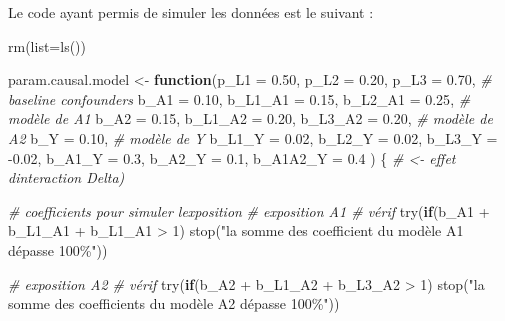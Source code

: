 \documentclass[
]{book}
\newenvironment{Shaded}{\begin{snugshade}}{\end{snugshade}}
\newcommand{\AttributeTok}[1]{\textcolor[rgb]{0.77,0.63,0.00}{#1}}
\newcommand{\CommentTok}[1]{\textcolor[rgb]{0.56,0.35,0.01}{\textit{#1}}}
\newcommand{\ControlFlowTok}[1]{\textcolor[rgb]{0.13,0.29,0.53}{\textbf{#1}}}
\newcommand{\DecValTok}[1]{\textcolor[rgb]{0.00,0.00,0.81}{#1}}
\newcommand{\FloatTok}[1]{\textcolor[rgb]{0.00,0.00,0.81}{#1}}
\newcommand{\FunctionTok}[1]{\textcolor[rgb]{0.00,0.00,0.00}{#1}}
\newcommand{\NormalTok}[1]{#1}
\newcommand{\OtherTok}[1]{\textcolor[rgb]{0.56,0.35,0.01}{#1}}
\newcommand{\SpecialCharTok}[1]{\textcolor[rgb]{0.00,0.00,0.00}{#1}}
\newcommand{\StringTok}[1]{\textcolor[rgb]{0.31,0.60,0.02}{#1}}
\begin{document}
Le code ayant permis de simuler les données est le suivant :

\begin{Shaded}
\begin{Highlighting}[]
  \FunctionTok{rm}\NormalTok{(}\AttributeTok{list=}\FunctionTok{ls}\NormalTok{())}

\NormalTok{  param.causal.model }\OtherTok{\textless{}{-}} \ControlFlowTok{function}\NormalTok{(}\AttributeTok{p\_L1 =} \FloatTok{0.50}\NormalTok{, }
                                 \AttributeTok{p\_L2 =} \FloatTok{0.20}\NormalTok{, }
                                 \AttributeTok{p\_L3 =} \FloatTok{0.70}\NormalTok{,       }\CommentTok{\# baseline confounders}
                                 \AttributeTok{b\_A1 =} \FloatTok{0.10}\NormalTok{, }
                                 \AttributeTok{b\_L1\_A1 =} \FloatTok{0.15}\NormalTok{, }
                                 \AttributeTok{b\_L2\_A1 =} \FloatTok{0.25}\NormalTok{, }\CommentTok{\# modèle de A1}
                                 \AttributeTok{b\_A2 =} \FloatTok{0.15}\NormalTok{, }
                                 \AttributeTok{b\_L1\_A2 =} \FloatTok{0.20}\NormalTok{, }
                                 \AttributeTok{b\_L3\_A2 =} \FloatTok{0.20}\NormalTok{, }\CommentTok{\# modèle de A2}
                                 \AttributeTok{b\_Y =} \FloatTok{0.10}\NormalTok{,      }\CommentTok{\# modèle de Y}
                                 \AttributeTok{b\_L1\_Y =} \FloatTok{0.02}\NormalTok{,}
                                 \AttributeTok{b\_L2\_Y =} \FloatTok{0.02}\NormalTok{,}
                                 \AttributeTok{b\_L3\_Y =} \SpecialCharTok{{-}}\FloatTok{0.02}\NormalTok{,}
                                 \AttributeTok{b\_A1\_Y =} \FloatTok{0.3}\NormalTok{,}
                                 \AttributeTok{b\_A2\_Y =} \FloatTok{0.1}\NormalTok{,}
                                 \AttributeTok{b\_A1A2\_Y =} \FloatTok{0.4}\NormalTok{ ) \{ }\CommentTok{\# \textless{}{-} effet d\textquotesingle{}interaction Delta)}

  \CommentTok{\# coefficients pour simuler l\textquotesingle{}exposition}
  \CommentTok{\# exposition A1  \# vérif}
  \FunctionTok{try}\NormalTok{(}\ControlFlowTok{if}\NormalTok{(b\_A1 }\SpecialCharTok{+}\NormalTok{ b\_L1\_A1 }\SpecialCharTok{+}\NormalTok{ b\_L1\_A1 }\SpecialCharTok{\textgreater{}} \DecValTok{1}\NormalTok{) }
    \FunctionTok{stop}\NormalTok{(}\StringTok{"la somme des coefficient du modèle A1 dépasse 100\%"}\NormalTok{))}
  
  \CommentTok{\# exposition A2  \# vérif}
  \FunctionTok{try}\NormalTok{(}\ControlFlowTok{if}\NormalTok{(b\_A2 }\SpecialCharTok{+}\NormalTok{ b\_L1\_A2 }\SpecialCharTok{+}\NormalTok{ b\_L3\_A2 }\SpecialCharTok{\textgreater{}} \DecValTok{1}\NormalTok{) }
    \FunctionTok{stop}\NormalTok{(}\StringTok{"la somme des coefficients du modèle A2 dépasse 100\%"}\NormalTok{))}
  

\end{Highlighting}
\end{Shaded}
\end{document}
